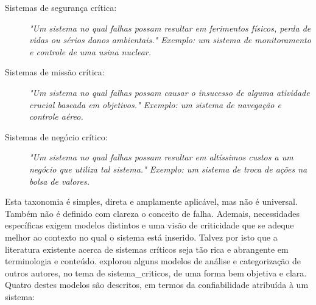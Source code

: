     \begin{description}
        \item[Sistemas de segurança crítica:] \emph{"Um sistema no qual falhas 
        possam resultar em ferimentos físicos, perda de vidas ou sérios danos 
        ambientais." Exemplo: um sistema de monitoramento e controle de uma 
        usina nuclear.}
        
        \item[Sistemas de missão crítica:] \emph{"Um sistema no qual falhas 
        possam causar o insucesso de alguma atividade crucial baseada em 
        objetivos." Exemplo: um sistema de navegação e controle aéreo.}
        
        \item[Sistemas de negócio crítico:] \emph{"Um sistema no qual falhas 
        possam resultar em altíssimos custos a um negócio que utiliza tal 
        sistema." Exemplo: um sistema de troca de ações na bolsa de valores. }
    \end{description}
    
    Esta taxonomia é simples, direta e amplamente aplicável, mas não é 
    universal. Também não é definido com clareza o conceito de falha. Ademais, 
    necessidades específicas exigem modelos distintos e uma visão de 
    criticidade que se adeque melhor ao contexto no qual o sistema está 
    inserido. Talvez por isto que a literatura existente acerca de sistemas 
    críticos seja tão rica e abrangente em terminologia e conteúdo. 
     explorou alguns modelos de análise e 
    categorização de outros autores, no tema de \glspl{sistema_critico}, de uma 
    forma bem objetiva e clara. Quatro destes modelos são descritos, em termos 
    da confiabilidade atribuída à um sistema:
    
